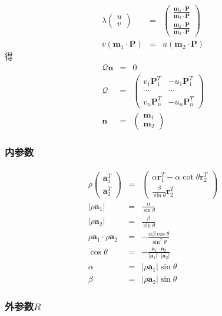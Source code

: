 \documentclass{beamer}
\newcommand{\cdummy}{\cdot}
\newcommand{\tmmathbf}[1]{\ensuremath{\boldsymbol{#1}}}
\begin{document}
{{\begin{frame}
  \begin{eqnarray*}
    \lambda \left(\begin{array}{c}
      u\\
      v
    \end{array}\right) & = & \left(\begin{array}{c}
      \frac{\tmmathbf{m}_1 \cdummy \tmmathbf{P}}{\tmmathbf{m}_3 \cdummy
      \tmmathbf{P}}\\
      \frac{\tmmathbf{m}_2 \cdummy \tmmathbf{P}}{\tmmathbf{m}_3 \cdummy
      \tmmathbf{P}}
    \end{array}\right)\\
    v (\tmmathbf{m}_1 \cdummy \tmmathbf{P}) & = & u (\tmmathbf{m}_2 \cdummy
    \tmmathbf{P})
  \end{eqnarray*}
  得
  \begin{eqnarray*}
    \mathcal{Q}\tmmathbf{n} & = & 0\\
    \mathcal{Q} & = & \left(\begin{array}{cc}
      v_1 \tmmathbf{P}^T_1 & - u_1 \tmmathbf{P}_1^T\\
      \cdots & \cdots\\
      v_n \tmmathbf{P}_n^T & - u_n \tmmathbf{P}_n^T
    \end{array}\right)\\
    \tmmathbf{n} & = & \left(\begin{array}{c}
      \tmmathbf{m}_1\\
      \tmmathbf{m}_2
    \end{array}\right)
  \end{eqnarray*}
  
\end{frame}}{\begin{frame}
  \frametitle{内参数}
  \begin{eqnarray*}
    \rho \left(\begin{array}{c}
      \tmmathbf{a}_1^T\\
      \tmmathbf{a}_2^T
    \end{array}\right) & = & \left(\begin{array}{c}
      \alpha \tmmathbf{r}_1^T - \alpha \cot \theta \tmmathbf{r}_2^T\\
      \frac{\beta}{\sin \theta} \tmmathbf{r}_2^T
    \end{array}\right)\\
    | \rho \tmmathbf{a}_1 | & = & \frac{\alpha}{\sin \theta}\\
    | \rho \tmmathbf{a}_2 | & = & \frac{\beta}{\sin \theta}\\
    \rho \tmmathbf{a}_1 \cdummy \rho \tmmathbf{a}_2 & = & - \frac{\alpha \beta
    \cos \theta}{\sin^2 \theta}\\
    \cos \theta & = & - \frac{\tmmathbf{a}_1 \cdummy \tmmathbf{a}_2}{|
    \tmmathbf{a}_1 | \cdummy | \tmmathbf{a}_2 |}\\
    \alpha & = & | \rho \tmmathbf{a}_1 | \sin \theta\\
    \beta & = & | \rho \tmmathbf{a}_2 | \sin \theta
  \end{eqnarray*}
\end{frame}}{\begin{frame}
  \frametitle{外参数$R$}
  

\end{frame}}}
\end{document}
